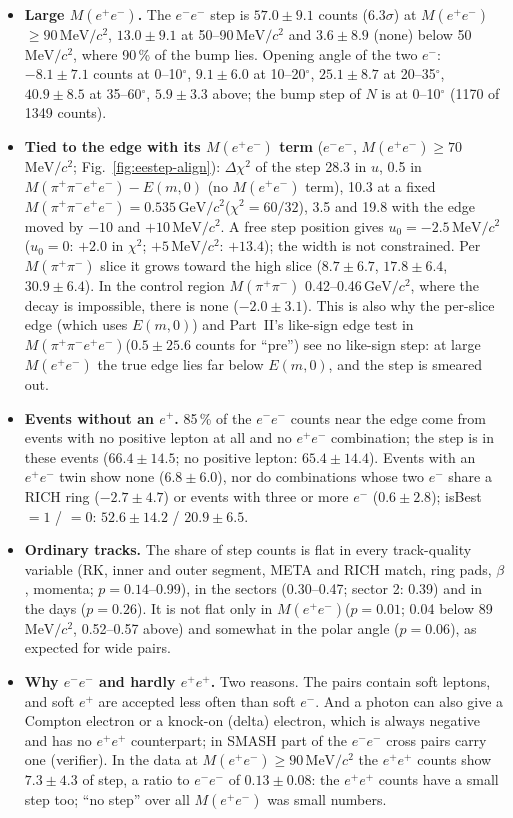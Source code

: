 \documentclass[11pt,a4paper]{article}
\newcommand{\Mfour}{\ensuremath{M(\pi^{+}\pi^{-}e^{+}e^{-})}\xspace}
\newcommand{\Mee}{\ensuremath{M(e^{+}e^{-})}\xspace}
\newcommand{\Mpipi}{\ensuremath{M(\pi^{+}\pi^{-})}\xspace}
\newcommand{\GeVcc}{\ensuremath{\mathrm{GeV}/c^{2}}\xspace}
\newcommand{\MeVcc}{\ensuremath{\mathrm{MeV}/c^{2}}\xspace}
\begin{document}
\begin{itemize}\setlength{\itemsep}{1pt}
\item \textbf{Large \Mee.} The $e^-e^-$ step is $57.0\pm9.1$ counts (6.3$\sigma$) at \Mee$\ge90$\,\MeVcc, $13.0\pm9.1$ at 50--90\,\MeVcc and
      $3.6\pm8.9$ (none) below 50\,\MeVcc, where 90\,\% of the bump lies. Opening angle of the two $e^-$: $-8.1\pm7.1$ counts at 0--10$^\circ$,
      $9.1\pm6.0$ at 10--20$^\circ$, $25.1\pm8.7$ at 20--35$^\circ$, $40.9\pm8.5$ at 35--60$^\circ$, $5.9\pm3.3$ above; the bump step of $N$ is at
      0--10$^\circ$ (1170 of 1349 counts).
\item \textbf{Tied to the edge with its \Mee term} ($e^-e^-$, \Mee$\ge70$\,\MeVcc; Fig.~\ref{fig:eestep-align}): $\Delta\chi^2$ of the step 28.3 in
      $u$, 0.5 in $\Mfour-E(m,0)$ (no \Mee term), 10.3 at a fixed $\Mfour=0.535$\,\GeVcc ($\chi^2=60/32$), 3.5 and 19.8 with the edge moved by
      $-10$ and $+10$\,\MeVcc. A free step position gives $u_0=-2.5$\,\MeVcc ($u_0=0$: $+2.0$ in $\chi^2$; $+5$\,\MeVcc: $+13.4$); the width is not
      constrained. Per \Mpipi slice it grows toward the high slice ($8.7\pm6.7$, $17.8\pm6.4$, $30.9\pm6.4$). In the control region
      \Mpipi 0.42--0.46\,\GeVcc, where the decay is impossible, there is none ($-2.0\pm3.1$). This is also why the per-slice edge (which uses
      $E(m,0)$) and Part~II's like-sign edge test in \Mfour ($0.5\pm25.6$ counts for ``pre'') see no like-sign step: at large \Mee the true edge lies
      far below $E(m,0)$, and the step is smeared out.
\item \textbf{Events without an $e^+$.} 85\,\% of the $e^-e^-$ counts near the edge come from events with no positive lepton at all and no $e^+e^-$
      combination; the step is in these events ($66.4\pm14.5$; no positive lepton: $65.4\pm14.4$). Events with an $e^+e^-$ twin show none ($6.8\pm6.0$),
      nor do combinations whose two $e^-$ share a RICH ring ($-2.7\pm4.7$) or events with three or more $e^-$ ($0.6\pm2.8$); isBest $=1$ / $=0$:
      $52.6\pm14.2$ / $20.9\pm6.5$.
\item \textbf{Ordinary tracks.} The share of step counts is flat in every track-quality variable (RK, inner and outer segment, META and RICH match,
      ring pads, $\beta$, momenta; $p=0.14$--0.99), in the sectors (0.30--0.47; sector 2: 0.39) and in the days ($p=0.26$). It is not flat only in
      \Mee ($p=0.01$; 0.04 below 89\,\MeVcc, 0.52--0.57 above) and somewhat in the polar angle ($p=0.06$), as expected for wide pairs.
\item \textbf{Why $e^-e^-$ and hardly $e^+e^+$.} Two reasons. The pairs contain soft leptons, and soft $e^+$ are accepted less often than
      soft $e^-$. And a photon can also give a Compton electron or a knock-on (delta) electron, which is always negative and has no $e^+e^+$
      counterpart; in SMASH part of the $e^-e^-$ cross pairs carry one (verifier). In the data at \Mee$\ge90$\,\MeVcc the $e^+e^+$ counts show
      $7.3\pm4.3$ of step, a ratio to $e^-e^-$ of $0.13\pm0.08$: the $e^+e^+$ counts have a small step too; ``no step'' over all \Mee was small
      numbers.
\end{itemize}
\end{document}
